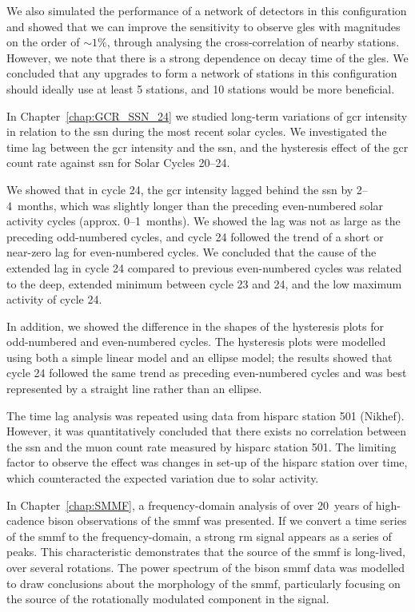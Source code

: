 We also simulated the performance of a network of detectors in this configuration and showed that we can improve the sensitivity to observe \glspl{gle} with magnitudes on the order of $\sim$$1 \%$, through analysing the cross-correlation of nearby stations. However, we note that there is a strong dependence on decay time of the \glspl{gle}. We concluded that any upgrades to form a network of stations in this configuration should ideally use at least 5 stations, and 10 stations would be more beneficial.


\vspace{2em}


In Chapter~\ref{chap:GCR_SSN_24} we studied long-term variations of \gls{gcr} intensity in relation to the \gls{ssn} during the most recent solar cycles. We investigated the time lag between the \gls{gcr} intensity and the \gls{ssn}, and the hysteresis effect of the \gls{gcr} count rate against \gls{ssn} for Solar Cycles 20--24.

We showed that in cycle 24, the \gls{gcr} intensity lagged behind the \gls{ssn} by 2--4~months, which was slightly longer than the preceding even-numbered solar activity cycles (approx. 0--1~months). We showed the lag was not as large as the preceding odd-numbered cycles, and cycle 24 followed the trend of a short or near-zero lag for even-numbered cycles. We concluded that the cause of the extended lag in cycle 24 compared to previous even-numbered cycles was related to the deep, extended minimum between cycle 23 and 24, and the low maximum activity of cycle 24.

In addition, we showed the difference in the shapes of the hysteresis plots for odd-numbered and even-numbered cycles. The hysteresis plots were modelled using both a simple linear model and an ellipse model; the results showed that cycle 24 followed the same trend as preceding even-numbered cycles and was best represented by a straight line rather than an ellipse.

The time lag analysis was repeated using data from \gls{hisparc} station 501 (Nikhef). However, it was quantitatively concluded that there exists no correlation between the \gls{ssn} and the muon count rate measured by \gls{hisparc} station 501. The limiting factor to observe the effect was changes in set-up of the \gls{hisparc} station over time, which counteracted the expected variation due to solar activity.


\vspace{2em}


In Chapter~\ref{chap:SMMF}, a frequency-domain analysis of over 20~years of high-cadence \gls{bison} observations of the \gls{smmf} was presented. If we convert a time series of the \gls{smmf} to the frequency-domain, a strong \gls{rm} signal appears as a series of peaks. This characteristic demonstrates that the source of the \gls{smmf} is long-lived, over several rotations. The power spectrum of the \gls{bison} \gls{smmf} data was modelled to draw conclusions about the morphology of the \gls{smmf}, particularly focusing on the source of the rotationally modulated component in the signal.

